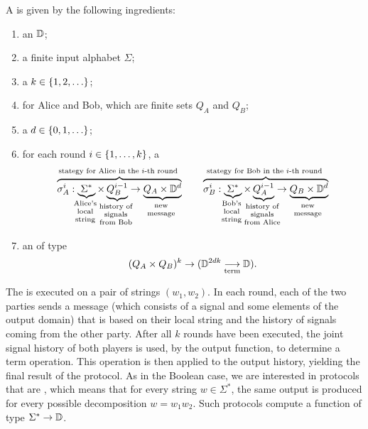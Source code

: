\begin{definition}\label{def:two-party-protocol-general}
  A 
   is given by the following ingredients: 
  \begin{enumerate}
    \item an  $\mathbb D$;
    \item a finite input alphabet $\Sigma$;
    \item a  $k \in \{1,2,\ldots\}$;
    \item {} for Alice and Bob, which are finite sets $Q_A$ and $Q_B$;
    \item a  $d \in \{0,1,\ldots\}$;
    \item for each round $i \in \{1,\ldots,k\}$, a 
    \begin{align*}
    \myoverbrace{\sigma_A^i : \myunderbrace{\Sigma^*}{Alice's \\ local\\ string} \times \myunderbrace{Q_B^{i-1}}{history of \\ signals \\ from Bob}  \to \myunderbrace{Q_A \times \domain^d}{new\\ message}}{stategy for Alice in the $i$-th round}
    \qquad 
        \myoverbrace{\sigma_B^i : \myunderbrace{\Sigma^*}{Bob's \\ local\\ string} \times \myunderbrace{Q_A^{i-1}}{history of \\ signals \\ from Alice}  \to \myunderbrace{Q_B \times \domain^d}{new\\ message}}{stategy for Bob in the $i$-th round}
    \end{align*}
    \item an  of type \begin{align*}
    (Q_A \times Q_B)^{k} \to (\mathbb D^{2dk} \underset{\text{term}}{\longrightarrow} \mathbb D).
    \end{align*}
  \end{enumerate}
\end{definition}


\AP
The  is executed on a pair of strings $(w_1,w_2)$. In each round, each
of the two parties  sends a message (which consists of a signal and some
elements of the output domain) that is based on their local string and the
history of signals coming from the other party. After all $k$ rounds have been
executed, the joint signal history of both players is used, by the output
function, to determine a term operation. This operation is then applied to the
output history, yielding the final result of the protocol. As in the Boolean
case, we are interested in protocols that are , which means that
for every string $w \in \Sigma^*$, the same output is produced for every
possible decomposition $w = w_1 w_2$. Such protocols compute a function of type
$\Sigma^* \to \mathbb D$. 


